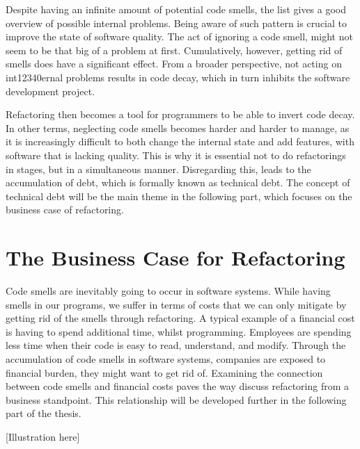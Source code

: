 Despite having an infinite amount of potential code smells,
	the list gives a good overview of possible internal problems.
Being aware of such pattern is crucial
	to improve the state of software quality.
The act of ignoring a code smell, 
	might not seem to be that big of a problem at first. 
Cumulatively, however, 
	getting rid of smells does have a significant effect.
From a broader perspective, not acting on int12340ernal problems results in
	code decay, which in turn inhibits the software development project. 

Refactoring then becomes a tool for programmers to be able to invert code decay.
In other terms, 
	neglecting code smells becomes harder and harder to manage, 
	as it is increasingly difficult to both change the internal state and 
	add features, with software that is lacking quality. 
This is why it is essential not to do refactorings in stages, 
	but in a simultaneous manner.
Disregarding this, 
	leads to the accumulation of debt, 
	which is formally known as technical debt. 
The concept of technical debt will be the main theme 
	in the following part, 
	which focuses on the business case of refactoring.



\section{The Business Case for Refactoring}
\label{sec:Business}
Code smells are inevitably going to occur in software systems. 
While having smells in our programs,
	we suffer in terms of costs that we can only mitigate 
	by getting rid of the smells through refactoring. 
A typical example of a financial cost is 
	having to spend additional time, whilst programming. 
Employees are spending less time 
	when their code is easy to read, understand, and modify.
Through the accumulation of code smells in software systems, companies are exposed to financial burden, they might want to get rid of.
Examining the connection between code smells and financial costs 
	paves the way discuss refactoring from a business standpoint.
This relationship will be developed further in the following part of the thesis.  

[Illustration here]

